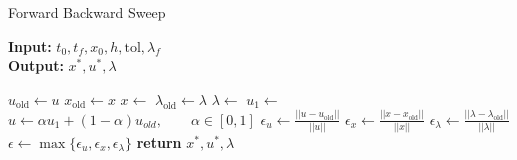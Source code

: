 \begin{algorithm}
  \caption{Forward Backward Sweep } \label{alg:forward_backward_sweep}
  \begin{flushleft}
    \hspace*{\algorithmicindent} \textbf{Input:} 
    $t_0, t_f, x_0,h, \text{tol}, \lambda_{f}$ \\
    \hspace*{\algorithmicindent} \textbf{Output:} 
    $x^*, u^*, \lambda$
  \end{flushleft}
  \begin{algorithmic}
      \State $u_{\text{old}} \gets u$ 
      \State $x_{\text{old}} \gets x$ 
      \State $ x \gets$
      \State $\lambda_{\text{old}} \gets \lambda $
      \State $\lambda \gets$ 
      \State $u_1 \gets$ 
      \State 
        $u \gets \alpha u_1 + (1-\alpha)u_{old}, 
        \qquad \alpha \in [0, 1]$
      \State 
      $\epsilon_u \gets \displaystyle 
        \frac{||u - u_{\text{old}}||}{||u||}$
      \State 
      $\epsilon_x \gets \displaystyle 
        \frac{||x - x_{\text{old}}||}{||x||}$
      \State 
        $\epsilon_{\lambda} \gets \displaystyle 
        \frac{||\lambda - \lambda_{\text{old}}||}{||\lambda||}$
      \State 
        $\epsilon \gets 
        \max{ 
          \{ \epsilon_u, \epsilon_x, \epsilon_{\lambda} \}
       }$
    \EndWhile\label{}
      \State \textbf{return} $ x^*, u^*, \lambda$
    \EndProcedure
  \end{algorithmic}
\end{algorithm}
\medskip  
